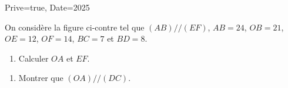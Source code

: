 \documentclass[a4paper,12pt]{article}
\begin{document}
\begin{Maquette}[Exam]{Prive=true, Date=2025}
\begin{exercice}[BaremeDetaille]
\begin{enumerate}
\anserline[7]
\end{enumerate}
\end{exercice}

\begin{exercice}[BaremeDetaille]
On considère la figure ci-contre tel que $(AB)//(EF)$, $AB=24$, $OB=21$, $OE=12$, $OF=14$, $BC=7$ et $BD=8$.
\vspace*{2mm}

\begin{minipage}{.7\linewidth}
\begin{enumerate}
\item{} Calculer $OA$ et $EF$.\newline\anserline[6]
\end{enumerate}
\end{minipage}%
\begin{minipage}{.3\linewidth}
\end{minipage}\vspace{5mm}

\begin{adjustbox}{minipage=0.97\linewidth, right}
\anserline[6]
\end{adjustbox}

\begin{enumerate}[start=2]
\item{} Montrer que $(OA)//(DC)$.\newline\anserline[12]
\end{enumerate}
\end{exercice}

\end{Maquette}
\end{document}
